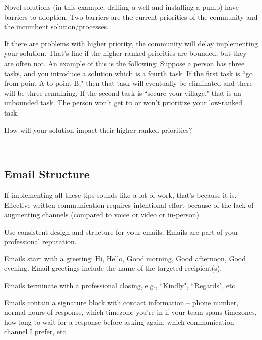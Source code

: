 Novel solutions (in this example, drilling a well and installing a pump) have barriers to adoption. Two barriers are the current priorities of the community and the incumbent solution/processes.

If there are problems with higher priority, the community will delay implementing your solution. That's fine if the higher-ranked priorities are bounded, but they are often not. An example of this is the following:
Suppose a person has three tasks, and you introduce a solution which is a fourth task.
If the first task is ``go from point A to point B," then that task will eventually be eliminated and there will be three remaining.
If the second task is ``secure your village," that is an unbounded task. The person won't get to or won't prioritize your low-ranked task.

How will your solution impact their higher-ranked priorities?

\ \\

\subsection*{Email Structure\label{sec:email-structure}}


If implementing all these tips sounds like a lot of work, that's because it is. Effective written communication requires intentional effort because of the lack of augmenting channels (compared to voice or video or in-person). 



Use consistent design and structure for your emails. Emails are part of your professional reputation.

Emails start with a greeting: Hi, Hello, Good morning, Good afternoon, Good evening. 
Email greetings include the name of the targeted recipient(s). 

Emails terminate with a professional closing, e.g., ``Kindly", ``Regards", etc

Emails contain a signature block with contact information -- phone number, normal hours of response, which timezone you're in if your team spans timezones, how long to wait for a response before asking again, which communication channel I prefer, etc.

